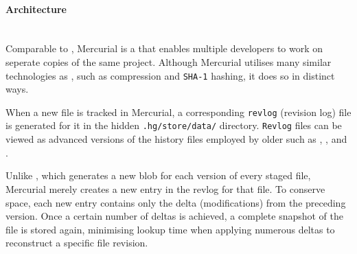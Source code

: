 \paragraph{Architecture}
\hfill\medskip\\
Comparable to , Mercurial is a  that enables multiple developers to work on seperate copies of the same project. Although Mercurial utilises many similar technologies as , such as compression and \lstinline{SHA-1} hashing, it does so in distinct ways.
\smallskip

When a new file is tracked in Mercurial, a corresponding \lstinline{revlog} (revision log) file is generated for it in the hidden \lstinline{.hg/store/data/} directory. \lstinline{Revlog} files can be viewed as advanced versions of the history files employed by older  such as , , and .
\smallskip

Unlike , which generates a new blob for each version of every staged file, Mercurial merely creates a new entry in the revlog for that file. To conserve space, each new entry contains only the delta (modifications) from the preceding version. Once a certain number of deltas is achieved, a complete snapshot of the file is stored again, minimising lookup time when applying numerous deltas to reconstruct a specific file revision.




